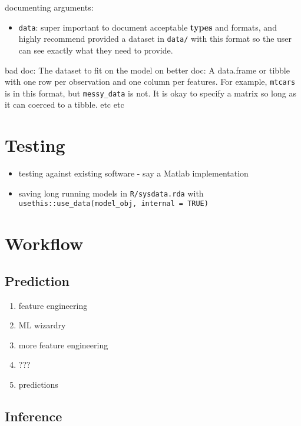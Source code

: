 \documentclass[]{book}
\providecommand{\tightlist}{%
  \setlength{\itemsep}{0pt}\setlength{\parskip}{0pt}}
\theoremstyle{definition}
\theoremstyle{definition}
\theoremstyle{definition}
\theoremstyle{remark}
\begin{document}
documenting arguments:

\begin{itemize}
\tightlist
\item
  \texttt{data}: super important to document acceptable \textbf{types}
  and formats, and highly recommend provided a dataset in \texttt{data/}
  with this format so the user can see exactly what they need to
  provide.
\end{itemize}

bad doc: The dataset to fit on the model on better doc: A data.frame or
tibble with one row per observation and one column per features. For
example, \texttt{mtcars} is in this format, but \texttt{messy\_data} is
not. It is okay to specify a matrix so long as it can coerced to a
tibble. etc etc

\chapter{Testing}\label{testing}

\begin{itemize}
\tightlist
\item
  testing against existing software - say a Matlab implementation
\item
  saving long running models in \texttt{R/sysdata.rda} with
  \texttt{usethis::use\_data(model\_obj,\ internal\ =\ TRUE)}
\end{itemize}

\chapter{Workflow}\label{workflow}

\section{Prediction}\label{prediction}

\begin{enumerate}
\def\labelenumi{\arabic{enumi}.}
\tightlist
\item
  feature engineering
\item
  ML wizardry
\item
  more feature engineering
\item
  ???
\item
  predictions
\end{enumerate}

\section{Inference}\label{inference}
\end{document}
